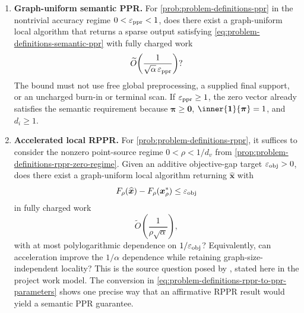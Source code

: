 \documentclass[11pt]{article}
\begin{document}
\begin{enumerate}[label=\textbf{OP\arabic*.},leftmargin=*]
\item \textbf{Graph-uniform semantic PPR.}
For \cref{prob:problem-definitions-ppr} in the nontrivial accuracy regime
$0<\varepsilon_{\mathrm{ppr}}<1$, does there exist a graph-uniform local algorithm that returns a
sparse output satisfying
\cref{eq:problem-definitions-semantic-ppr} with fully charged work
\begin{equation}
    \widetilde O\!\left(
      \frac{1}{\sqrt{\alpha}\,\varepsilon_{\mathrm{ppr}}}
    \right)?
    \label{eq:problem-definitions-open-ppr-work}
\end{equation}
The bound must not use free global preprocessing, a supplied final support, or
an uncharged burn-in or terminal scan.  If $\varepsilon_{\mathrm{ppr}}\geq1$, the zero vector
already satisfies the semantic requirement because $\bm{\pi}\geq\bm{0}$,
$\inner{\one}{\bm{\pi}}=1$, and $d_i\geq1$.

\item \textbf{Accelerated local RPPR.}
For \cref{prob:problem-definitions-rppr}, it suffices to consider the nonzero
point-source regime $0<\rho<1/d_v$ from
\cref{prop:problem-definitions-rppr-zero-regime}.  Given an additive
objective-gap target $\varepsilon_{\mathrm{obj}}>0$, does there exist a graph-uniform local
algorithm returning $\widehat{\bm{x}}$ with
\begin{equation}
    F_\rho(\widehat{\bm{x}})-F_\rho(\bm{x}_\rho^*)
    \leq\varepsilon_{\mathrm{obj}}
    \label{eq:problem-definitions-open-rppr-accuracy}
\end{equation}
in fully charged work
\begin{equation}
    \widetilde O\!\left(
      \frac{1}{\rho\sqrt{\alpha}}
    \right),
    \label{eq:problem-definitions-open-rppr-work}
\end{equation}
with at most polylogarithmic dependence on $1/\varepsilon_{\mathrm{obj}}$?  Equivalently, can
acceleration improve the $1/\alpha$ dependence while retaining
graph-size-independent locality?  This is the source question posed by
\citet[Section~3]{fountoulakis2022open}, stated here in the project work
model.  The conversion in
\cref{eq:problem-definitions-rppr-to-ppr-parameters} shows one precise way
that an affirmative RPPR result would yield a semantic PPR guarantee.


\end{enumerate}
\end{document}
